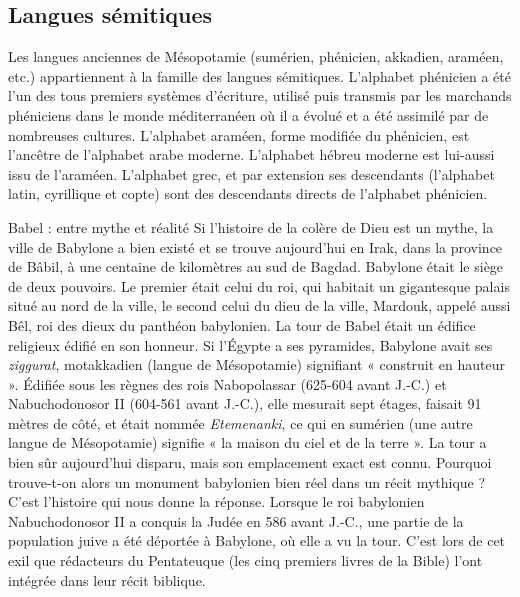 \subsection{Langues sémitiques}
Les langues anciennes de Mésopotamie (sumérien, phénicien, akkadien, araméen, etc.) appartiennent à la famille des langues sémitiques. L’alphabet phénicien a été l’un des tous premiers systèmes d’écriture, utilisé puis transmis par les marchands phéniciens dans le monde méditerranéen où il a évolué et a été assimilé par de nombreuses cultures. L’alphabet araméen, forme modifiée du phénicien, est l’ancêtre de l’alphabet arabe moderne. L’alphabet hébreu moderne est lui-aussi issu de l’araméen. L’alphabet grec, et par extension ses descendants (l’alphabet latin, cyrillique et copte) sont des descendants directs de l’alphabet phénicien.
\begin{bbcomplement}{Babel : entre mythe et réalité}
Si l’histoire de la colère de Dieu est un mythe, la ville de Babylone a bien existé et se trouve aujourd’hui en Irak, dans la province de Bâbil, à une centaine de kilomètres au sud de Bagdad. Babylone était le siège de deux pouvoirs. Le premier était celui du roi, qui habitait un gigantesque palais situé au nord de la ville, le second celui du dieu de la ville, Mardouk, appelé aussi Bêl, roi des dieux du panthéon babylonien. La tour de Babel était un édifice religieux édifié en son honneur. Si l’Égypte a ses pyramides, Babylone avait ses \textit{ziggurat}, motakkadien (langue de Mésopotamie) signifiant « construit en hauteur ». Édifiée sous les règnes des rois Nabopolassar (625-604 avant J.-C.) et Nabuchodonosor II (604-561 avant J.-C.), elle mesurait sept étages, faisait 91 mètres de côté, et était nommée \textit{Etemenanki}, ce qui en sumérien (une autre langue de Mésopotamie) signifie « la maison du ciel et de la terre ». La tour a bien sûr aujourd’hui disparu, mais son emplacement exact est connu. Pourquoi trouve-t-on alors un monument babylonien bien réel dans un récit mythique ? C’est l’histoire qui nous donne la réponse. Lorsque le roi babylonien Nabuchodonosor II a conquis la Judée en 586 avant J.-C., une partie de la population juive a été déportée à Babylone, où elle a vu la tour. C’est lors de cet exil que rédacteurs du Pentateuque (les cinq premiers livres de la Bible) l’ont intégrée dans leur récit biblique.
\end{bbcomplement}

